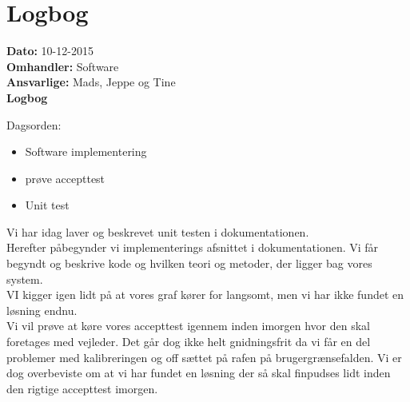 \section{Logbog}

\textbf{Dato:} 10-12-2015 \\
\textbf{Omhandler:} Software \\
\textbf{Ansvarlige:} Mads, Jeppe og Tine \\
\textbf{Logbog}

Dagsorden:
\begin{itemize}
	\item Software implementering
	\item prøve accepttest
	\item Unit test
\end{itemize}

Vi har idag laver og beskrevet unit testen i dokumentationen.\\
Herefter påbegynder vi implementerings afsnittet i dokumentationen. Vi får begyndt og beskrive kode og hvilken teori og metoder, der ligger bag vores system. \\
VI kigger igen lidt på at vores graf kører for langsomt, men vi har ikke fundet en løsning endnu.\\
Vi vil prøve at køre vores accepttest igennem inden imorgen hvor den skal foretages med vejleder. Det går dog ikke helt gnidningsfrit da vi får en del problemer med kalibreringen og off sættet på rafen på brugergrænsefalden. Vi er dog overbeviste om at vi har fundet en løsning der så skal finpudses lidt inden den rigtige accepttest imorgen.  